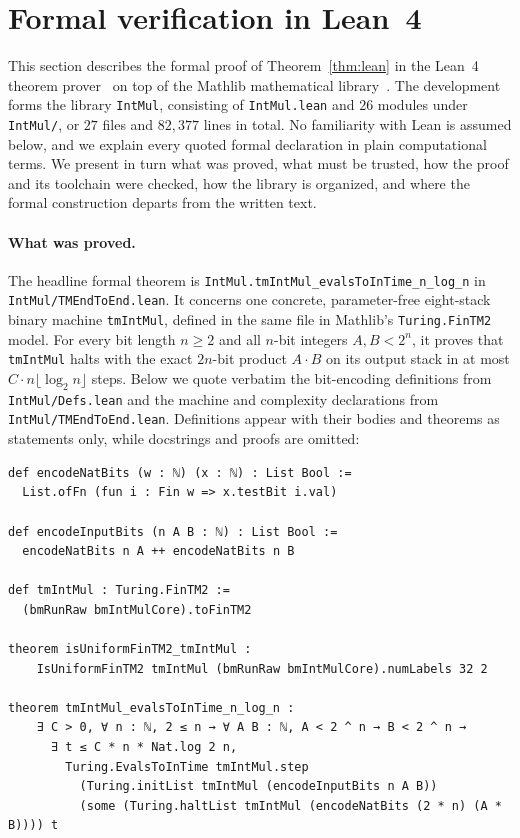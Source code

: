 \section{Formal verification in Lean~4}\label{sec:lean}

This section describes the formal proof of Theorem~\ref{thm:lean} in the Lean~4 theorem prover~\cite{dMU21} on top of the Mathlib mathematical library~\cite{Mathlib20}. The development~\cite{LeanMS26} forms the library \texttt{IntMul}, consisting of \texttt{IntMul.lean} and $26$ modules under \texttt{IntMul/}, or $27$ files and $82{,}377$ lines in total. No familiarity with Lean is assumed below, and we explain every quoted formal declaration in plain computational terms. We present in turn what was proved, what must be trusted, how the proof and its toolchain were checked, how the library is organized, and where the formal construction departs from the written text.

\paragraph{What was proved.}
The headline formal theorem is \texttt{IntMul.\allowbreak tmIntMul\_\allowbreak evalsToInTime\_\allowbreak n\_\allowbreak log\_\allowbreak n} in \texttt{IntMul/\allowbreak TMEndToEnd.lean}. It concerns one concrete, parameter-free eight-stack binary machine \texttt{tmIntMul}, defined in the same file in Mathlib's \texttt{Turing.FinTM2} model. For every bit length $n \ge 2$ and all $n$-bit integers $A, B < 2^n$, it proves that \texttt{tmIntMul} halts with the exact $2n$-bit product $A \cdot B$ on its output stack in at most $C \cdot n \lfloor \log_2 n \rfloor$ steps. Below we quote verbatim the bit-encoding definitions from \texttt{IntMul/\allowbreak Defs.lean} and the machine and complexity declarations from \texttt{IntMul/\allowbreak TMEndToEnd.lean}. Definitions appear with their bodies and theorems as statements only, while docstrings and proofs are omitted:
\begin{Verbatim}[fontsize=\footnotesize,frame=single,framesep=2mm]
def encodeNatBits (w : ℕ) (x : ℕ) : List Bool :=
  List.ofFn (fun i : Fin w => x.testBit i.val)

def encodeInputBits (n A B : ℕ) : List Bool :=
  encodeNatBits n A ++ encodeNatBits n B

def tmIntMul : Turing.FinTM2 :=
  (bmRunRaw bmIntMulCore).toFinTM2

theorem isUniformFinTM2_tmIntMul :
    IsUniformFinTM2 tmIntMul (bmRunRaw bmIntMulCore).numLabels 32 2

theorem tmIntMul_evalsToInTime_n_log_n :
    ∃ C > 0, ∀ n : ℕ, 2 ≤ n → ∀ A B : ℕ, A < 2 ^ n → B < 2 ^ n →
      ∃ t ≤ C * n * Nat.log 2 n,
        Turing.EvalsToInTime tmIntMul.step
          (Turing.initList tmIntMul (encodeInputBits n A B))
          (some (Turing.haltList tmIntMul (encodeNatBits (2 * n) (A * B)))) t
\end{Verbatim}

